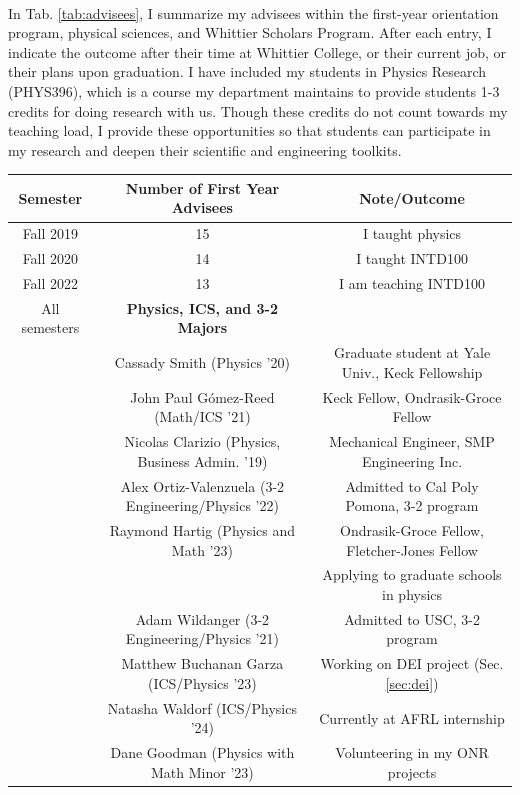 \documentclass[../../main.tex]{subfiles}
\begin{document}
\\
\vspace{0.15cm}
In Tab. \ref{tab:advisees}, I summarize my advisees within the first-year orientation program, physical sciences, and Whittier Scholars Program.  After each entry, I indicate the outcome after their time at Whittier College, or their current job, or their plans upon graduation.  I have included my students in Physics Research (PHYS396), which is a course my department maintains to provide students 1-3 credits for doing research with us.  Though these credits do not count towards my teaching load, I provide these opportunities so that students can participate in my research and deepen their scientific and engineering toolkits.

\begin{table}[ht]
\footnotesize
\centering
\begin{tabular}{| c | c | c |}
\hline
\hline
Semester & \textbf{Number of First Year Advisees} & Note/Outcome \\ \hline
Fall 2019 & 15 & I taught physics \\ \hline
Fall 2020 & 14 & I taught INTD100 \\ \hline
Fall 2022 & 13 & I am teaching INTD100 \\ \hline
\hline
All semesters & \textbf{Physics, ICS, and 3-2 Majors} & \\ \hline 
& Cassady Smith (Physics '20) & Graduate student at Yale Univ., Keck Fellowship \\ \hline
& John Paul G\'{o}mez-Reed (Math/ICS '21) & Keck Fellow, Ondrasik-Groce Fellow \\ \hline
& Nicolas Clarizio (Physics, Business Admin. '19) & Mechanical Engineer, SMP Engineering Inc. \\ \hline
& Alex Ortiz-Valenzuela (3-2 Engineering/Physics  '22) & Admitted to Cal Poly Pomona, 3-2 program \\ \hline
& Raymond Hartig (Physics and Math '23) & Ondrasik-Groce Fellow, Fletcher-Jones Fellow \\ & & Applying to graduate schools in physics \\ \hline
& Adam Wildanger (3-2 Engineering/Physics '21) & Admitted to USC, 3-2 program \\ \hline
& Matthew Buchanan Garza (ICS/Physics '23) & Working on DEI project (Sec. \ref{sec:dei}) \\ \hline
& Natasha Waldorf (ICS/Physics '24) & Currently at AFRL internship \\ \hline
& Dane Goodman (Physics with Math Minor '23) & Volunteering in my ONR projects \\ \hline \hline

\end{tabular}
\end{table}
\end{document}
